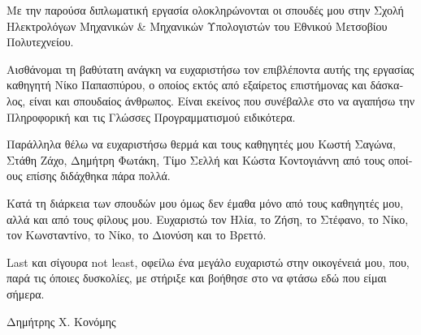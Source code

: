\begin{greek}
\begin{acknowledgements}
Με την παρούσα διπλωματική εργασία ολοκληρώνονται οι σπουδές μου στην Σχολή 
Ηλεκτρολόγων Μηχανικών \& Μηχανικών Υπολογιστών του Εθνικού Μετσοβίου 
Πολυτεχνείου.

Αισθάνομαι τη βαθύτατη ανάγκη να ευχαριστήσω τον επιβλέποντα αυτής της εργασίας 
καθηγητή Νίκο Παπασπύρου, ο οποίος εκτός από εξαίρετος επιστήμονας και δάσκαλος, 
είναι και σπουδαίος άνθρωπος. Είναι εκείνος που συνέβαλλε στο να αγαπήσω την 
Πληροφορική και τις Γλώσσες Προγραμματισμού ειδικότερα. 

Παράλληλα θέλω να ευχαριστήσω θερμά και τους καθηγητές μου Κωστή Σαγώνα, 
Στάθη Ζάχο, Δημήτρη Φωτάκη, Τίμο Σελλή και Κώστα Κοντογιάννη από τους οποίους επίσης διδάχθηκα 
πάρα πολλά.

Κατά τη διάρκεια των σπουδών μου όμως δεν έμαθα μόνο από τους καθηγητές μου, αλλά 
και από τους φίλους μου. Ευχαριστώ τον Ηλία, το Ζήση, το Στέφανο, το Νίκο, 
τον Κωνσταντίνο, το Νίκο, το Διονύση και το Βρεττό.

Last και σίγουρα not least, οφείλω ένα μεγάλο ευχαριστώ στην οικογένειά μου, που, 
παρά τις όποιες δυσκολίες, με στήριξε και βοήθησε στο να φτάσω εδώ που 
είμαι σήμερα.
\begin{flushright}Δημήτρης X. Κονόμης\end{flushright}
\end{acknowledgements}
\end{greek}
